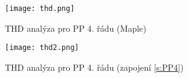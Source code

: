 \begin{figure}[h]
\centering
\texttt{[image: thd.png]}
\caption[THD analýza pro PP 4. řádu (Maple)]{THD analýza pro PP 4. řádu (Maple)}
\end{figure}
\begin{figure}[h]
\centering
\texttt{[image: thd2.png]}
\caption[THD analýza pro PP 4. řádu (zapojení \ref{s:PP4})]{THD analýza pro PP 4. řádu (zapojení \ref{s:PP4})}
\end{figure}